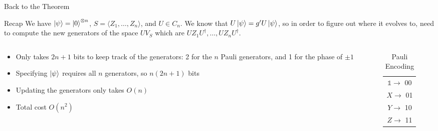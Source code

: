 \documentclass[11pt,aspectratio=1610]{beamer}
\begin{document}
\begin{frame}{Back to the Theorem}
	\begin{exampleblock}{Recap}
		We have $\ket{\psi} = \ket{0}^{\otimes n}$, $S = \langle Z_1,\ldots , Z_n\rangle$, and $U\in C_n$. We know that $U\ket{\psi} = g'U\ket{\psi}$, so in order to figure out where it evolves to, need to compute the new generators of the space $UV_S$ which are $UZ_1U^\dagger,\ldots, UZ_nU^\dagger$.
	\end{exampleblock}
	\begin{columns}
		\begin{column}{0.7\textwidth}
			\begin{itemize}
				\item Only takes $2n+1$ bits to keep track of the generators: 2 for the $n$ Pauli generators, and 1 for the phase of $\pm 1$
				\item Specifying $\ket{\psi}$ requires all $n$ generators, so $n(2n+1)$ bits
				\item Updating the generators only takes $O(n)$
				\item Total cost $O(n^2)$
			\end{itemize}
		\end{column}
		\begin{column}{0.3\textwidth}
			\begin{table}
				\centering
				\begin{tabular}{c}
					$\mathbb{1}\longrightarrow$ 00 \\
					$X\longrightarrow$ 01          \\
					$Y\longrightarrow$ 10          \\
					$Z\longrightarrow$ 11
				\end{tabular}
				\caption{Pauli Encoding}
				\label{tab:encoding}
			\end{table}
		\end{column}
	\end{columns}
\end{frame}
\end{document}
